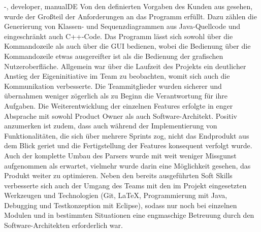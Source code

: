 \documentclass[twoside]{report}
\begin{document}
\begin{shownto}{-, developer, manualDE}
Von den definierten Vorgaben des Kunden aus gesehen, wurde der Großteil der Anforderungen an das Programm erfüllt. Dazu zählen die Generierung von Klassen- und Sequenzdiagrammen aus Java-Quellcode und eingeschränkt auch C++-Code. Das Programm lässt sich sowohl über die Kommandozeile als auch über die GUI bedienen, wobei die Bedienung über die Kommandozeile etwas ausgereifter ist als die Bedienung der grafischen Nutzeroberfläche. 
\nsecend
{}
Allgemein war über die Laufzeit des Projekts ein deutlicher Anstieg der Eigeninitiative im Team zu beobachten, womit sich auch die Kommunikation verbesserte. Die Teammitglieder wurden sicherer und übernahmen weniger zögerlich als zu Beginn die Verantwortung für ihre Aufgaben. Die Weiterentwicklung der einzelnen Features erfolgte in enger Absprache mit sowohl Product Owner als auch Software-Architekt. Positiv anzumerken ist zudem, dass auch während der Implementierung von Funktionalitäten, die sich über mehrere Sprints zog, nicht das Endprodukt aus dem Blick geriet und die Fertigstellung der Features konsequent verfolgt wurde. Auch der komplette Umbau des Parsers wurde mit weit weniger Missgunst aufgenommen als erwartet, vielmehr wurde darin eine Möglichkeit gesehen, das Produkt weiter zu optimieren.
\nsecend
{}
Neben den bereits ausgeführten Soft Skills verbesserte sich auch der Umgang des Teams mit den im Projekt eingesetzten Werkzeugen und Technologien (Git, LaTeX, Programmierung mit Java, Debugging und Testkonzeption mit Eclipse), sodass nur noch bei einzelnen Modulen und in bestimmten Situationen eine engmaschige Betreuung durch den Software-Architekten erforderlich war. 
\nsecend
\nsecend


\end{shownto}
\end{document}

